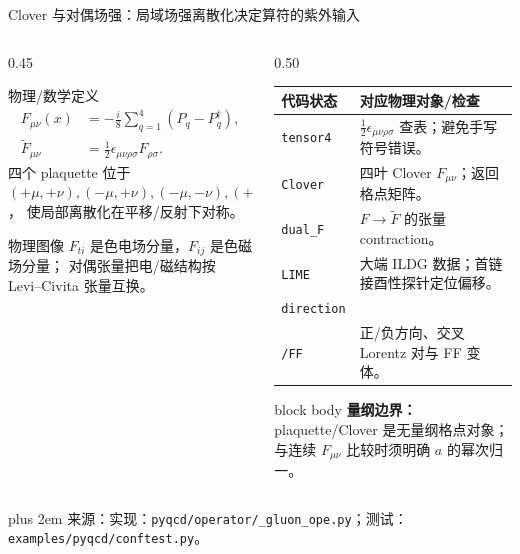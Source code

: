 \documentclass[UTF8,aspectratio=169,11pt]{ctexbeamer}
\newcommand{\source}[1]{%
  \par\vspace{0.02em}\begingroup\fontsize{6}{6.8}\selectfont\raggedright\sloppy
  \setlength{\emergencystretch}{3em}\rightskip=0pt plus 2em
  \color{muted}来源：#1\par\endgroup}
\begin{document}
\begin{frame}[t]{Clover 与对偶场强：局域场强离散化决定算符的紫外输入}
  \small
  \begin{columns}[T,totalwidth=\textwidth]
    \begin{column}{0.45\textwidth}
      \begin{block}{物理/数学定义}
        \begin{equation*}
          \begin{aligned}
            F_{\mu\nu}(x)&=-\frac{i}{8}\sum_{q=1}^{4}
            \left(P_q-P_q^\dagger\right),\\[-0.2em]
            \widetilde F_{\mu\nu}&=\frac12\epsilon_{\mu\nu\rho\sigma}F_{\rho\sigma}.
          \end{aligned}
        \end{equation*}
        四个 plaquette 位于 \((+\mu,+\nu),(-\mu,+\nu),(-\mu,-\nu),(+\mu,-\nu)\)，
        使局部离散化在平移/反射下对称。
      \end{block}
      \begin{block}{物理图像}
        \(F_{ti}\) 是色电场分量，\(F_{ij}\) 是色磁场分量；
        对偶张量把电/磁结构按 Levi--Civita 张量互换。
      \end{block}
    \end{column}
    \begin{column}{0.50\textwidth}
      \footnotesize
      \begin{tabular}{@{}p{1.8cm}p{5.1cm}@{}}
        \toprule
        代码状态 & 对应物理对象/检查\\
        \midrule
        \texttt{tensor4} & \(\frac12\epsilon_{\mu\nu\rho\sigma}\) 查表；避免手写符号错误。\\
        \texttt{Clover} & 四叶 Clover \(F_{\mu\nu}\)；返回格点矩阵。\\
        \texttt{dual\_F} & \(F\to\widetilde F\) 的张量 contraction。\\
        \texttt{LIME} & 大端 ILDG 数据；首链接酉性探针定位偏移。\\
        \texttt{direction}\\[-0.2em]\texttt{/FF} & 正/负方向、交叉 Lorentz 对与 FF 变体。\\
        \bottomrule
      \end{tabular}
      \vfill
      \begin{beamercolorbox}[wd=0.98\linewidth,sep=0.5em,rounded=true]{block body}
        \textbf{量纲边界：}plaquette/Clover 是无量纲格点对象；与连续 \(F_{\mu\nu}\) 比较时须明确 \(a\) 的幂次归一。
      \end{beamercolorbox}
    \end{column}
  \end{columns}
  \source{实现：\nolinkurl{pyqcd/operator/_gluon_ope.py}；测试：\nolinkurl{examples/pyqcd/conftest.py}。}
\end{frame}
\end{document}
